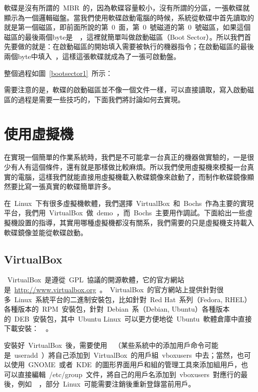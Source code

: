 軟碟是沒有所謂的~MBR~的，因為軟碟容量較小，沒有所謂的分區，一張軟碟就顯示為一個邏輯磁盤。當我們使用軟碟啟動電腦的時候，系統從軟碟中首先讀取的就是第一個磁區，即前面所說的第~0~面，第~0~號磁道的第~0~號磁區，如果這個磁區的最後兩個byte是~~，這裡就簡單叫做啟動磁區（Boot Sector）。所以我們首先要做的就是：在啟動磁區的開始填入需要被執行的機器指令；在啟動磁區的最後兩個byte中填入~，這樣這張軟碟就成為了一張可啟動盤。


整個過程如圖~\ref{bootsector1}~所示：


需要注意的是，軟碟的啟動磁區並不像一個文件一樣，可以直接讀取，寫入啟動磁區的過程是需要一些技巧的，下面我們將討論如何去實現。

\section{使用虛擬機}

在實現一個簡單的作業系統時，我們是不可能拿一台真正的機器做實驗的，一是很少有人有這個條件，還有就是那樣做比較麻煩。所以我們使用虛擬機來模擬一台真實的電腦，這樣我們就能直接用虛擬機載入軟碟鏡像來啟動了，而制作軟碟鏡像顯然要比寫一張真實的軟碟簡單許多。

在~Linux~下有很多虛擬機軟體，我們選擇~VirtualBox~和~Bochs~作為主要的實現平台，我們用~VirtualBox~做~demo~，而~Bochs~主要用作調試。下面給出一些虛擬機設置的指導，其實用哪種虛擬機都沒有關系，我們需要的只是虛擬機支持載入軟碟鏡像並能從軟碟啟動。

\subsection{VirtualBox}

~VirtualBox~是遵從~GPL~協議的開源軟體，它的官方網站是~\url{http://www.virtualbox.org}~。~VirtualBox~的官方網站上提供針對很多~Linux~系統平台的二進制安裝包，比如針對~Red Hat~系列（Fedora, RHEL）各種版本的~RPM~安裝包，針對~Debian~系（Debian, Ubuntu）各種版本的~DEB~安裝包，其中~Ubuntu
Linux~可以更方便地從~Ubuntu~軟體倉庫中直接下載安裝：~~。

安裝好~VirtualBox~後，需要使用~~（某些系統中的添加用戶命令可能是~useradd~）將自己添加到~VirtualBox~的用戶組~vboxusers~中去；當然，也可以使用~GNOME~或者~KDE~的圖形界面用戶和組的管理工具來添加組用戶，也可以直接編輯~/etc/group~文件，將自己的用戶名添加到~vboxusers~對應行的最後，例如~~，部分~Linux~可能需要注銷後重新登錄當前用戶。


